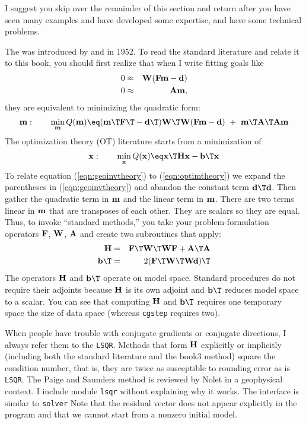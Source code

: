 \par
I suggest you skip over the remainder of this section and return
after you have seen many examples and have developed some expertise,
and have some technical problems.
\par
The  was introduced
by  and  in 1952.
To read the standard literature and relate it to this book,
you should first realize that when I write fitting goals like
\begin{eqnarray}
 0  &\approx&  \bold W( \bold F \bold m - \bold d ) \\
 0  &\approx&  \bold A \bold m,
\end{eqnarray}
they are equivalent to minimizing the quadratic form:
\begin{equation}
\bold  m:  \quad\quad
\min_{\bold m}  Q(\bold m) \eq
( \bold m\T\bold F\T - \bold d\T)\bold W\T\bold W
( \bold F \bold m  - \bold d)
\ +\ \bold m\T\bold A\T\bold A\bold m
\label{eqn:geoinvtheory}
\end{equation}
The optimization theory (OT) literature starts from a minimization of
\begin{equation}
 \bold x:  \quad\quad
 \min_{\bold x} Q(\bold x) \eq \bold x\T\bold H \bold x - \bold b\T \bold x
\label{eqn:optimtheory}
\end{equation}
To relate equation (\ref{eqn:geoinvtheory}) to (\ref{eqn:optimtheory})
we expand the parentheses in (\ref{eqn:geoinvtheory}) 
and abandon the constant term $\bold d\T\bold d$.
Then gather the quadratic term in $\bold m$ and the linear term in $\bold m$.
There are two terms linear in $\bold m$
that are transposes of each other.
They are scalars so they are equal.
Thus, to invoke ``standard methods,'' you take
your problem-formulation operators $\bold F$, $\bold W$, $\bold A$
and create two subroutines that apply:
\begin{eqnarray}
 \bold H   &=&  \bold F\T\bold W\T\bold W\bold F + \bold A\T\bold A  \\
 \bold b\T  &=&  2(\bold F\T\bold W\T\bold W\bold d)\T
\end{eqnarray}
The operators $\bold H$ and $\bold b\T$ operate on model space.
Standard procedures do not require their adjoints
because $\bold H$ is its own adjoint and $\bold b\T$
reduces model space to a scalar.
You can see that computing $\bold H$ and $\bold b\T$ requires
one temporary space the size of data space
(whereas \texttt{cgstep} requires two).
\par
When people have trouble with conjugate gradients or conjugate
directions, I always refer them to the  {\tt LSQR}.  Methods that form $\bold H$ explicitly or
implicitly (including both the standard literature and the book3
method) square the condition number, that is, they are twice as
susceptible to rounding error as is {\tt LSQR}. The Paige and
Saunders method is reviewed by Nolet in a geophysical context. I
include module \texttt{lsqr}
without explaining
why it works. The interface is similar to \texttt{solver}
Note that the residual vector does not appear
explicitly in the program and that we cannot start from a nonzero
initial model.  

